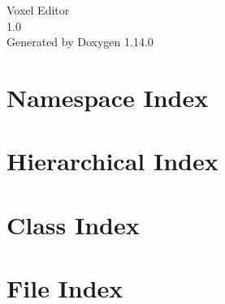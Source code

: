 \documentclass[twoside]{book}
\newcommand{\+}{\discretionary{\mbox{\scriptsize$\hookleftarrow$}}{}{}}
\newcommand{\clearemptydoublepage}{%
    \newpage{\pagestyle{empty}\cleardoublepage}%
  }
\begin{document}
  \raggedbottom
  \begin{titlepage}
  \vspace*{7cm}
  \begin{center}%
  {\Large Voxel Editor}\\
  [1ex]\large 1.\+0 \\
  \vspace*{1cm}
  {\large Generated by Doxygen 1.14.0}\\
  \end{center}
  \end{titlepage}
  \clearemptydoublepage
  \tableofcontents
  \clearemptydoublepage




























\chapter{Namespace Index}

\chapter{Hierarchical Index}

\chapter{Class Index}

\chapter{File Index}

\end{document}
